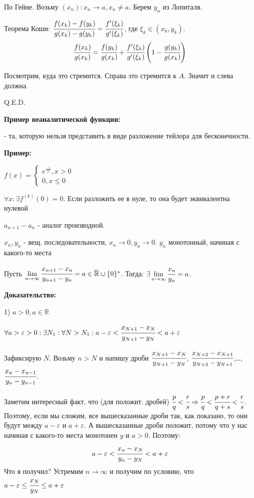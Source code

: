 По Гейне. Возьму $(x_n): x_n \rightarrow a,x_n\neq a$. Берем $y_n$ из Лопиталя. 

Теорема Коши: $\cfrac{f(x_k)-f(y_k)}{g(x_k)-g(y_k)} = \cfrac{f'(\xi_k)}{g'(\xi_k)}$, где $\xi_k \in (x_k, y_k)$.
$$\cfrac{f(x_k)}{g(x_k)} = \cfrac{f(y_k)}{g(x_k)} + \cfrac{f'(\xi_k)}{g'(\xi_k)}\left(1 - \cfrac{g(y_k)}{g(x_k)}\right)$$
    
Посмотрим, куда это стремится. Справа это стремится к $A$. Значит и слева должна.

\hfill Q.E.D.

\textbf{Пример неаналитической функции:}

 - та, которую нельзя представить в виде разложение тейлора для бесконечности.

\textbf{Пример:}

$f(x) = \begin{cases}
    e^\frac{-1}{x}, x>0\\
    0,x\leq 0
\end{cases}$

$\forall x: \exists f^{(k)}(0) = 0$. Если разложить ее в нуле, то она будет эквивалентна нулевой


$a_{n+1}-a_n$ - аналог производной.


$x_n,y_n$ - вещ. последовательности, $x_n \rightarrow 0 , y_n \rightarrow 0$. $y_n$ монотонный, начиная с какого-то места

Пусть $\lim\limits_{n\rightarrow \infty} \cfrac{x_{n+1}-x_n}{y_{n+1}-y_n} =  a\in \overline{\mathbb{R}}\cup \{0\}^*$. Тогда: $\exists \lim\limits_{n \rightarrow\infty}\cfrac{x_n}{y_n} = a$.

\textbf{Доказательство:}

1) $a>0, a \in \mathbb{R}$

$\forall a>\varepsilon>0:\exists N_1: \forall N>N_1: a-\varepsilon < \cfrac{x_{N+1}-x_N}{y_{N+1}-y_N} <a+\varepsilon$

Зафиксирую $N$. Возьму $n>N$ и напишу дроби $\cfrac{x_{N+1}-x_N}{y_{N+1}-y_N}$, $\cfrac{x_{N+2}-x_{N+1}}{y_{N+2}-y_{N+1}}$,\ldots, $\cfrac{x_{n}-x_{n-1}}{y_{n}-y_{n-1}}$.

Заметим интересный факт, что (для положит. дробей) $\cfrac{p}{q}<\cfrac{r}{s} \Rightarrow \cfrac{p}{q}<\cfrac{p+r}{q+s}<\cfrac{r}{s} $. Поэтому, если мы сложим, все вышесказанные дроби так, как показано, то они будут между $a-\varepsilon$ и $a+\varepsilon$. А вышесказанные дроби положит, потому что у нас начиная с какого-то места монотонен $y$ и $a>0$. Поэтому:
$$a-\varepsilon<\cfrac{x_n-x_N}{y_n-y_N}<a+\varepsilon$$
Что я получил? Устремим $n \rightarrow \infty$ и получим по условию, что $a-\varepsilon\leq\cfrac{x_N}{y_N}\leq a + \varepsilon$

